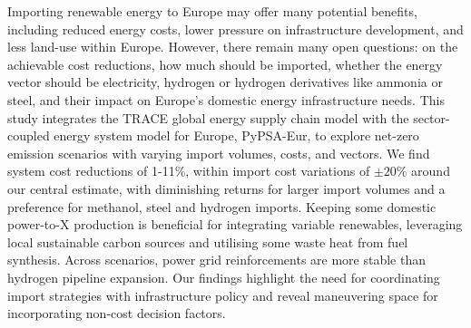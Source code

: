 Importing renewable energy to Europe may offer many potential benefits,
including reduced energy costs, lower pressure on infrastructure development,
and less land-use within Europe. However, there remain many open questions: on
the achievable cost reductions, how much should be imported, whether the energy
vector should be electricity, hydrogen or hydrogen derivatives like ammonia or
steel, and their impact on Europe's domestic energy infrastructure needs. This
study integrates the TRACE global energy supply chain model with the
sector-coupled energy system model for Europe, PyPSA-Eur, to explore net-zero
emission scenarios with varying import volumes, costs, and vectors. We find
system cost reductions of 1-11\%, within import cost variations of $\pm20\%$
around our central estimate, with diminishing returns for larger import volumes
and a preference for methanol, steel and hydrogen imports. Keeping some domestic
power-to-X production is beneficial for integrating variable renewables,
leveraging local sustainable carbon sources and utilising some waste heat from
fuel synthesis. Across scenarios, power grid reinforcements are more stable than
hydrogen pipeline expansion. Our findings highlight the need for coordinating
import strategies with infrastructure policy and reveal maneuvering space for
incorporating non-cost decision factors.
